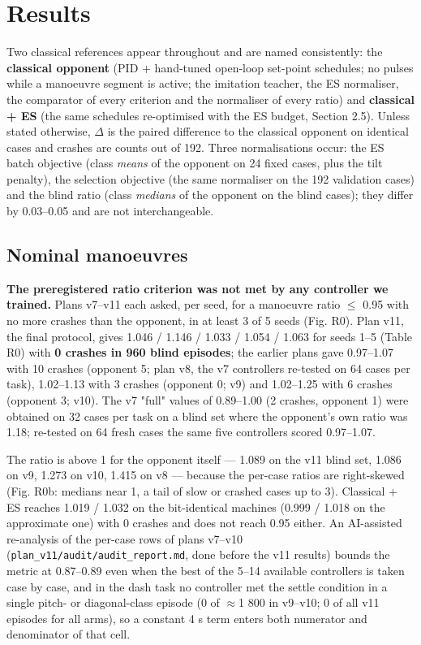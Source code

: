 \documentclass[10pt,a4paper]{article}
\begin{document}
\section{Results}

Two classical references appear throughout and are named consistently: the \textbf{classical opponent} (PID + hand-tuned open-loop set-point schedules; no pulses while a manoeuvre segment is active; the imitation teacher, the ES normaliser, the comparator of every criterion and the normaliser of every ratio) and \textbf{classical + ES} (the same schedules re-optimised with the ES budget, Section 2.5). Unless stated otherwise, $\Delta$ is the paired difference to the classical opponent on identical cases and crashes are counts out of 192. Three normalisations occur: the ES batch objective (class \emph{means} of the opponent on 24 fixed cases, plus the tilt penalty), the selection objective (the same normaliser on the 192 validation cases) and the blind ratio (class \emph{medians} of the opponent on the blind cases); they differ by 0.03--0.05 and are not interchangeable.

\subsection{Nominal manoeuvres}

\textbf{The preregistered ratio criterion was not met by any controller we trained.} Plans v7--v11 each asked, per seed, for a manoeuvre ratio $\le$ 0.95 with no more crashes than the opponent, in at least 3 of 5 seeds (Fig. R0). Plan v11, the final protocol, gives 1.046 / 1.146 / 1.033 / 1.054 / 1.063 for seeds 1--5 (Table R0) with \textbf{0 crashes in 960 blind episodes}; the earlier plans gave 0.97--1.07 with 10 crashes (opponent 5; plan v8, the v7 controllers re-tested on 64 cases per task), 1.02--1.13 with 3 crashes (opponent 0; v9) and 1.02--1.25 with 6 crashes (opponent 3; v10). The v7 "full" values of 0.89--1.00 (2 crashes, opponent 1) were obtained on 32 cases per task on a blind set where the opponent's own ratio was 1.18; re-tested on 64 fresh cases the same five controllers scored 0.97--1.07.

The ratio is above 1 for the opponent itself --- 1.089 on the v11 blind set, 1.086 on v9, 1.273 on v10, 1.415 on v8 --- because the per-case ratios are right-skewed (Fig. R0b: medians near 1, a tail of slow or crashed cases up to 3). Classical + ES reaches 1.019 / 1.032 on the bit-identical machines (0.999 / 1.018 on the approximate one) with 0 crashes and does not reach 0.95 either. An AI-assisted re-analysis of the per-case rows of plans v7--v10 (\texttt{plan\_v11/audit/audit\_report.md}, done before the v11 results) bounds the metric at 0.87--0.89 even when the best of the 5--14 available controllers is taken case by case, and in the dash task no controller met the settle condition in a single pitch- or diagonal-class episode (0 of $\approx$1 800 in v9--v10; 0 of all v11 episodes for all arms), so a constant 4 s term enters both numerator and denominator of that cell.
\end{document}
